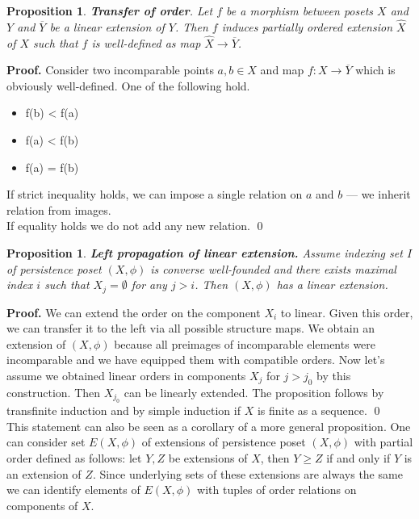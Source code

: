 \documentclass[english,12pt]{article}
\newcounter{stmcounter}[section]
\numberwithin{equation}{section}
\newtheorem{proposition}[stmcounter]{Proposition}
\theoremstyle{definition}
\theoremstyle{remark}
\newenvironment{pf}{\noindent\textbf{Proof.}}{\qed}
\renewcommand{\geq}{\geqslant}
\begin{document}
\begin{proposition}
  \textbf{Transfer of order}. Let $f$ be a morphism between posets $X$ and $Y$ and $\overline{Y}$ be a linear extension of $Y$. Then $f$ induces partially ordered extension $\hat{X}$ of $X$ such that $f$ is well-defined as map $\hat{X} \to \overline{Y}$.
\end{proposition}

\begin{pf}
  Consider two incomparable points $a, b \in X$ and map $f : X \to \overline{Y}$ which is obviously well-defined. One of the following hold.\\
  \begin{itemize}
    \item f(b) < f(a)
    \item f(a) < f(b)
    \item f(a) = f(b)
  \end{itemize}
  If strict inequality holds, we can impose a single relation on $a$ and $b$ --- we inherit relation from images.\\
  If equality holds we do not add any new relation.
\end{pf}

\begin{proposition}
  \textbf{Left propagation of linear extension.} Assume indexing set $I$ of persistence poset $(X,\phi)$ is converse well-founded and there exists maximal index $i$ such that $X_j = \emptyset$ for any $j > i$. Then $(X,\phi)$ has a linear extension.
\end{proposition}

\begin{pf}
  We can extend the order on the component $X_i$ to linear. Given this order, we can transfer it to the left via all possible structure maps. We obtain an extension of $(X,\phi)$ because all preimages of incomparable elements were incomparable and we have equipped them with compatible orders. Now let's assume we obtained linear orders in components $X_j$ for $j > j_0$ by this construction. Then $X_{j_0}$ can be linearly extended. The proposition follows by transfinite induction and by simple induction if $X$ is finite as a sequence.
\end{pf}\\

This statement can also be seen as a corollary of a more general proposition.
One can consider set $E(X,\phi)$ of extensions of persistence poset $(X,\phi)$ with partial order defined as follows: let $Y, Z$ be extensions of $X$, then $Y \geq Z$ if and only if $Y$ is an extension of $Z$. Since underlying sets of these extensions are always the same we can identify elements of $E(X,\phi)$ with tuples of order relations on components of $X$.
\end{document}
